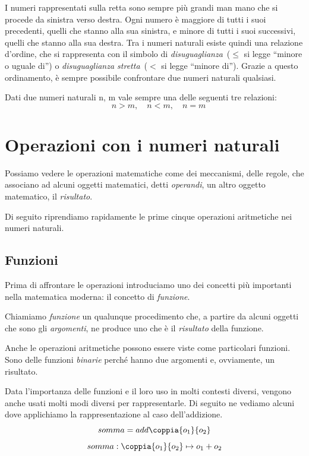 I numeri rappresentati sulla retta sono sempre più grandi man mano che si 
procede da sinistra verso destra. 
Ogni numero è maggiore di tutti i suoi precedenti, quelli che stanno alla 
sua sinistra, e minore di tutti i suoi successivi, quelli che stanno alla 
sua destra. 
Tra i numeri naturali esiste quindi una relazione d'ordine, che si 
rappresenta con il simbolo di 
\emph{disuguaglianza}~(\(\le\) si legge ``minore o uguale di'') o 
\emph{disuguaglianza stretta}~(\(<\) si legge ``minore di'').
Grazie a questo ordinamento, è sempre possibile confrontare due numeri 
naturali qualsiasi.

\begin{legge}[di tricotomia]
Dati due numeri naturali n, m vale sempre una delle seguenti tre relazioni: 
\[\quad n > m,\quad n < m,\quad n = m\]
\end{legge}

\section{Operazioni con i numeri naturali}
\label{sec:nat_operazioni}

Possiamo vedere le operazioni matematiche come dei meccanismi, delle regole, 
che associano ad alcuni oggetti matematici, detti \emph{operandi}, 
un altro oggetto matematico, il \emph{risultato}.

Di seguito riprendiamo rapidamente le prime cinque operazioni aritmetiche 
nei numeri naturali. 

\subsection{Funzioni}

Prima di affrontare le operazioni introduciamo uno dei concetti più importanti
nella matematica moderna: il concetto di \emph{funzione}.

\begin{definizione}
Chiamiamo \emph{funzione} un qualunque procedimento che, 
a partire da alcuni oggetti che sono gli \emph{argomenti}, 
ne produce uno che è il \emph{risultato} della funzione.
\end{definizione}

Anche le operazioni aritmetiche possono essere viste come particolari
funzioni. Sono delle funzioni \emph{binarie} perché hanno due argomenti e,
ovviamente, un risultato.

Data l'importanza delle funzioni e il loro uso in molti contesti diversi, 
vengono anche usati molti modi diversi per rappresentarle. 
Di seguito ne vediamo alcuni dove applichiamo la rappresentazione al caso
dell'addizione.
\[somma = add \coppia{o_1}{o_2} \]
\[somma: \coppia{o_1}{o_2} \mapsto o_1 + o_2\]

